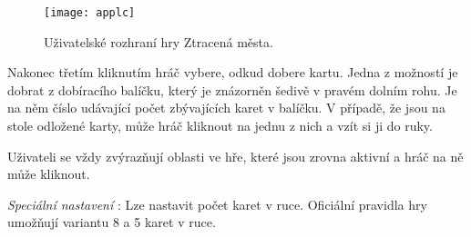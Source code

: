 \begin{figure}
  \centering
  \texttt{[image: applc]}
	\caption{Uživatelské rozhraní hry Ztracená města. }
	\label{fig-applc}
\end{figure}

Nakonec třetím kliknutím hráč vybere, odkud dobere kartu. Jedna z možností je dobrat z dobíracího balíčku, který je znázorněn šedivě v pravém dolním rohu. Je na něm číslo udávající počet zbývajících karet v balíčku. V případě, že jsou na stole odložené karty, může hráč kliknout na jednu z nich a vzít si ji do ruky.

Uživateli se vždy zvýrazňují oblasti ve hře, které jsou zrovna aktivní a hráč na ně může kliknout.

\emph{Speciální nastavení} : Lze nastavit počet karet v ruce. Oficiální pravidla hry umožňují variantu 8 a 5 karet v ruce.

\endinput
